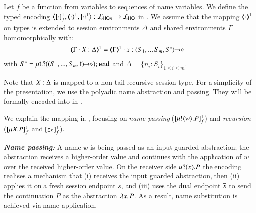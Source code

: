 \begin{definition}
\label{d:enc:hopitoho}
Let $f$ be a function from variables to sequences of name variables.
%
We define the typed encoding 
$\enco{\map{\cdot}^{1}_f, \mapt{\cdot}^{1}, \mapa{\cdot}^{1}}: \tyl{L}_{\HOp} \to \tyl{L}_{\HO}$ in 
. 
We assume that the mapping $(\!\!\langle\cdot\rangle\!\!)^{1}$ on types is extended to 
session environments $\Delta$
and
shared environments $\Gamma$ homomorphically with: 
\[
	\begin{array}{l}
		\tmap{\Gamma \cat \varp{X}:\Delta}{1}  =  \tmap{\Gamma}{1} \cat x:\shot{(S_1,..,S_m,S^*)} \ 
	\end{array}
\]
with
$S^* = \mu\mathsf{t}.? ((S_1,...,S_m,\mathsf{t})\!\! \rightarrow\!\! \diamond) ; \mathtt{end}$
and $\Delta = \{n_i:S_i\}_{1\leq i\leq m}$. 
\end{definition}

\smallskip 
\noi Note that $X:\Delta$ is mapped to a non-tail
recursive session type.
For a simplicity of the presentation, we use the polyadic name abstraction and passing.
They will be formally encoded into \HO in \secref{sec:extension}.

\noi We explain the mapping in , focusing 
on {\em name passing} ($[\!\![u ! \langle w \rangle . P]\!\!]^1_f$) and  
{\em recursion} ($[\!\![\mu X. P]\!\!]^1_f$ and $[\!\![z_X]\!\!]^1_f$). 

{\bf\em Name passing:}
A name $w$ is being passed as an input guarded abstraction;
the abstraction receives a higher-order
value and continues with the application of $w$ over
the received higher-order value.
On the receiver side $u ? (x) . P$ 
the encoding realises a mechanism that (i) receives
the input guarded abstraction, then (ii) applies it on a fresh session endpoint $s$, 
and (iii) uses
the dual endpoint $\overline{s}$ to send the continuation $P$ as the abstraction
$\lambda x.\,P$. 
As a result, name substitution is achieved via name application.


